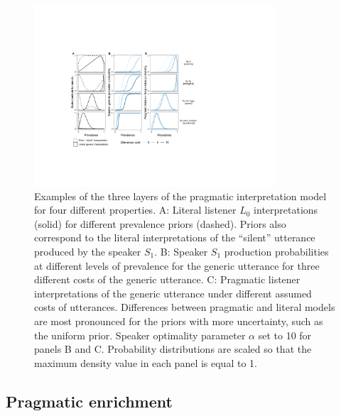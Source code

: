 \documentclass[floatsintext,doc]{apa6}
\begin{document}
\begin{figure}
\centering
\includegraphics[width=0.8\textwidth]{figs/tripartite.pdf}
\vspace{0.5cm}
\caption{Examples of the three layers of the pragmatic interpretation model for four different properties. A: Literal listener $L_0$ interpretations (solid) for different prevalence priors (dashed). Priors also correspond to the literal interpretations of the ``silent'' utterance produced by the speaker $S_1$. B: Speaker $S_1$ production probabilities at different levels of prevalence for the generic utterance for three different costs of the generic utterance. C: Pragmatic listener interpretations of the generic utterance under different assumed costs of utterances. Differences between pragmatic and literal models are most pronounced for the priors with more uncertainty, such as the uniform prior. Speaker optimality parameter $\alpha$ set to 10 for panels B and C. Probability distributions are scaled so that the maximum density value in each panel is equal to 1. }
\label{fig:tripartite}
\end{figure}


\hypertarget{pragmatic-enrichment}{%
\subsection{Pragmatic enrichment}\label{pragmatic-enrichment}}
\end{document}
